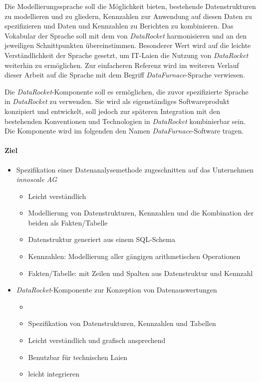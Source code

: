 \documentclass[
  language=german, %
  type=bachelor%
]{isthesis}
\begin{document}
\begin{content}
  Die Modellierungssprache soll die Möglichkeit bieten, bestehende
  Datenstrukturen zu modellieren und zu gliedern, Kennzahlen zur Anwendung auf
  diesen Daten zu spezifizieren und Daten und Kennzahlen zu Berichten zu
  kombinieren. Das Vokabular der Sprache soll mit dem von \textit{DataRocket}
  harmonisieren und an den jeweiligen Schnittpunkten übereinstimmen. Besonderer
  Wert wird auf die leichte Verständlichkeit der Sprache gesetzt, um IT-Laien
  die Nutzung von \textit{DataRocket} weiterhin zu ermöglichen. Zur
  einfacheren Referenz wird im weiteren Verlauf dieser Arbeit auf die Sprache
  mit dem Begriff \textit{DataFurnace}-Sprache  verwiesen.
  
  Die \textit{DataRocket}-Komponente soll es ermöglichen, die zuvor
  spezifizierte Sprache in \textit{DataRocket} zu verwenden. Sie wird als
  eigenständiges Softwareprodukt konzipiert und entwickelt, soll jedoch zur
  späteren Integration mit den bestehenden Konventionen und Technologien in
  \textit{DataRocket} kombinierbar sein. Die Komponente wird im folgenden den
  Namen \textit{DataFurnace}-Software  tragen.


  \paragraph{Ziel}
  \begin{itemize}
    \item Spezifikation einer Datenanalysemethode zugeschnitten auf das
      Unternehmen \textit{innoscale AG}
      \begin{itemize}
        \item Leicht verständlich
        \item Modellierung von Datenstrukturen, Kennzahlen und die Kombination der
          beiden als Fakten/Tabelle
        \item Datenstruktur generiert aus einem SQL-Schema
        \item Kennzahlen: Modellierung aller gängigen arithmetischen Operationen
        \item Fakten/Tabelle: mit Zeilen und Spalten aus Datenstruktur und Kennzahl 
      \end{itemize}
    \item \textit{DataRocket}-Komponente zur Konzeption von Datenauswertungen
      \begin{itemize}
        \item {}
        \item Spezifikation von Datenstrukturen, Kennzahlen und Tabellen
        \item Leicht verständlich und grafisch ansprechend
        \item Benutzbar für technischen Laien
        \item leicht integrieren
      \end{itemize}
  \end{itemize}


\end{content}
\end{document}
